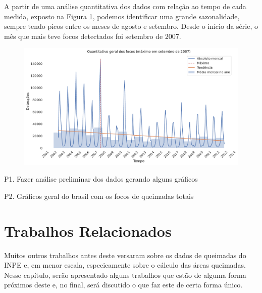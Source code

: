 \documentclass[cic,tc]{iiufrgs}
\begin{document}
A partir de uma análise quantitativa dos dados com relação ao tempo de cada medida, exposto na Figura \ref{fig:quantitativo_geral}, podemos identificar uma grande sazonalidade, sempre tendo picos entre os meses de agosto e setembro. Desde o início da série, o mês que mais teve focos detectados foi setembro de 2007. 

\begin{figure}[H]
    \caption{}
    \begin{center}
        \includegraphics[width=35em]{quantitativo_geral}
    \end{center}
    \label{fig:quantitativo_geral}
\end{figure}


P1. Fazer análise preliminar dos dados gerando alguns gráficos \par
P2. Gráficos geral do brasil com os focos de queimadas totais \cite{geographicDataSciencePython} \par



\chapter{Trabalhos Relacionados}

Muitos outros trabalhos antes deste versaram sobre os dados de queimadas do INPE e, em menor escala, especicamente sobre o cálculo das áreas queimadas. Nesse capítulo, serão apresentado alguns trabalhos que estão de alguma forma próximos deste e, no final, será discutido o que faz este de certa forma único. \par
\end{document}
